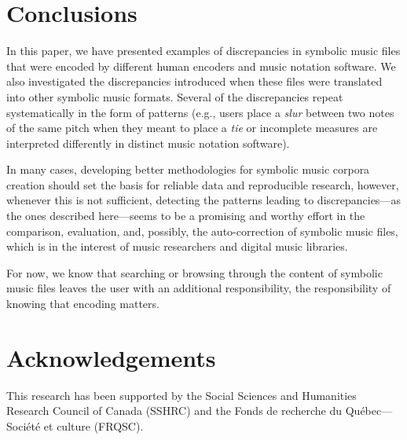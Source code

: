 \section{Conclusions}

In this paper, we have presented examples of discrepancies in symbolic music files that were encoded by different human encoders and music notation software. We also investigated the discrepancies introduced when these files were translated into other symbolic music formats. Several of the discrepancies repeat systematically in the form of patterns (e.g., users place a \emph{slur} between two notes of the same pitch when they meant to place a \emph{tie} or incomplete measures are interpreted differently in distinct music notation software).

In many cases, developing better methodologies for symbolic music corpora creation \cite{mckay2018} should set the basis for reliable data and reproducible research, however, whenever this is not sufficient, detecting the patterns leading to discrepancies---as the ones described here---seems to be a promising and worthy effort in the comparison, evaluation, and, possibly, the auto-correction of symbolic music files, which is in the interest of music researchers and digital music libraries.

For now, we know that searching or browsing through the content of symbolic music files leaves the user with an additional responsibility, the responsibility of knowing that encoding matters.


\section{Acknowledgements}
This research has been supported by the Social Sciences and Humanities Research Council of Canada (SSHRC) and the Fonds de recherche du Qu\'ebec---Soci\'et\'e et culture (FRQSC).
